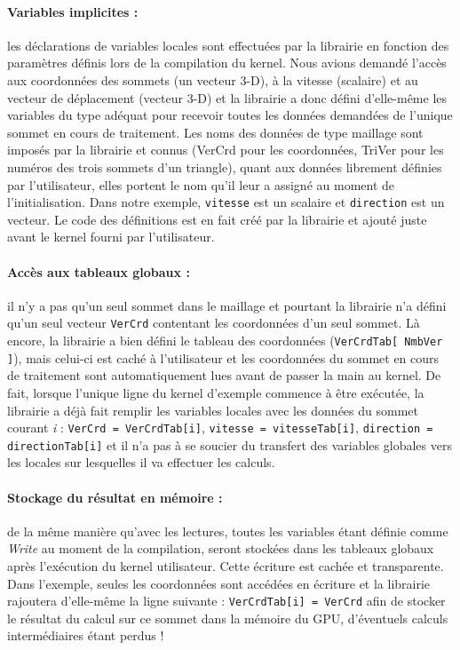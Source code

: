 \documentclass[a4paper,12pt]{article}
\begin{document}
\paragraph{Variables implicites : } les déclarations de variables locales sont effectuées par la librairie en fonction des paramètres définis lors de la compilation du kernel.
Nous avions demandé l'accès aux coordonnées des sommets (un vecteur 3-D), à la vitesse (scalaire) et au vecteur de déplacement (vecteur 3-D) et la librairie a donc défini d'elle-même les variables du type adéquat pour recevoir toutes les données demandées de l'unique sommet en cours de traitement. Les noms des données de type maillage sont imposés par la librairie et connus (VerCrd pour les coordonnées, TriVer pour les numéros des trois sommets d'un triangle), quant aux données librement définies par l'utilisateur, elles portent le nom qu'il leur a assigné au moment de l'initialisation.
Dans notre exemple, {\tt vitesse} est un scalaire et {\tt direction} est un vecteur.
Le code des définitions est en fait créé par la librairie et ajouté juste avant le kernel fourni par l'utilisateur.

\paragraph{Accès aux tableaux globaux : } il n'y a pas qu'un seul sommet dans le maillage et pourtant la librairie n'a défini qu'un seul vecteur {\tt VerCrd} contentant les coordonnées d'un seul sommet. Là encore, la librairie a bien défini le tableau des coordonnées ({\tt VerCrdTab[ NmbVer ]}), mais celui-ci est caché à l'utilisateur et les coordonnées du sommet en cours de traitement sont automatiquement lues avant de passer la main au kernel.
De fait, lorsque l'unique ligne du kernel d'exemple commence à être exécutée, la librairie a déjà fait remplir les variables locales avec les données du sommet courant \emph{i} : {\tt VerCrd = VerCrdTab[i]}, {\tt vitesse = vitesseTab[i]}, {\tt direction = directionTab[i]} et il n'a pas à se soucier du transfert des variables globales vers les locales sur lesquelles il va effectuer les calculs.

\paragraph{Stockage du résultat en mémoire : } de la même manière qu'avec les lectures, toutes les variables étant définie comme \emph{Write} au moment de la compilation, seront stockées dans les tableaux globaux après l'exécution du kernel utilisateur. Cette écriture est cachée et transparente. Dans l'exemple, seules les coordonnées sont accédées en écriture et la librairie rajoutera d'elle-même la ligne suivante : {\tt VerCrdTab[i] = VerCrd} afin de stocker le résultat du calcul sur ce sommet dans la mémoire du GPU, d'éventuels calculs intermédiaires étant perdus !
\end{document}

